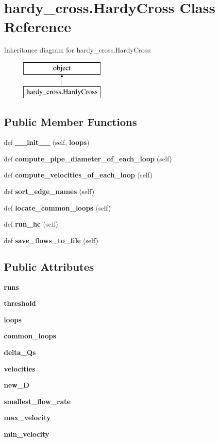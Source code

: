 \section{hardy\+\_\+cross.\+Hardy\+Cross Class Reference}
\label{classhardy__cross_1_1_hardy_cross}
Inheritance diagram for hardy\+\_\+cross.\+Hardy\+Cross\+:\begin{figure}[H]
\begin{center}
\leavevmode
\includegraphics[height=2.000000cm]{classhardy__cross_1_1_hardy_cross}
\end{center}
\end{figure}
\subsection*{Public Member Functions}
\begin{DoxyCompactItemize}
\item 
def \textbf{ \+\_\+\+\_\+init\+\_\+\+\_\+} (self, \textbf{ loops})
\item 
def \textbf{ compute\+\_\+pipe\+\_\+diameter\+\_\+of\+\_\+each\+\_\+loop} (self)
\item 
def \textbf{ compute\+\_\+velocities\+\_\+of\+\_\+each\+\_\+loop} (self)
\item 
def \textbf{ sort\+\_\+edge\+\_\+names} (self)
\item 
def \textbf{ locate\+\_\+common\+\_\+loops} (self)
\item 
def \textbf{ run\+\_\+hc} (self)
\item 
def \textbf{ save\+\_\+flows\+\_\+to\+\_\+file} (self)
\end{DoxyCompactItemize}
\subsection*{Public Attributes}
\begin{DoxyCompactItemize}
\item 
\textbf{ runs}
\item 
\textbf{ threshold}
\item 
\textbf{ loops}
\item 
\textbf{ common\+\_\+loops}
\item 
\textbf{ delta\+\_\+\+Qs}
\item 
\textbf{ velocities}
\item 
\textbf{ new\+\_\+D}
\item 
\textbf{ smallest\+\_\+flow\+\_\+rate}
\item 
\textbf{ max\+\_\+velocity}
\item 
\textbf{ min\+\_\+velocity}
\end{DoxyCompactItemize}


